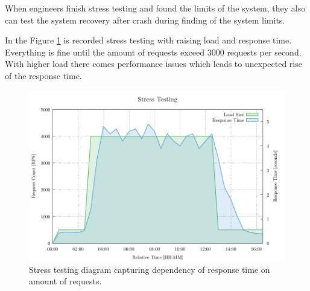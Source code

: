 When engineers finish stress testing and found the limits of the system, they also can test the system recovery after crash during finding of the system limits.

In the Figure \ref{fig:stress_test} is recorded stress testing with raising load and response time. Everything is fine until the amount of requests exceed 3000 requests per second. With higher load there comes performance issues which leads to unexpected rise of the response time.

\begin{figure}[H]
  \centering
  \includegraphics[width=15cm]{obrazky-figures/stress_testing.pdf}
  \caption{Stress testing diagram capturing dependency of response time on amount of requests.}
  \label{fig:stress_test}
\end{figure}

